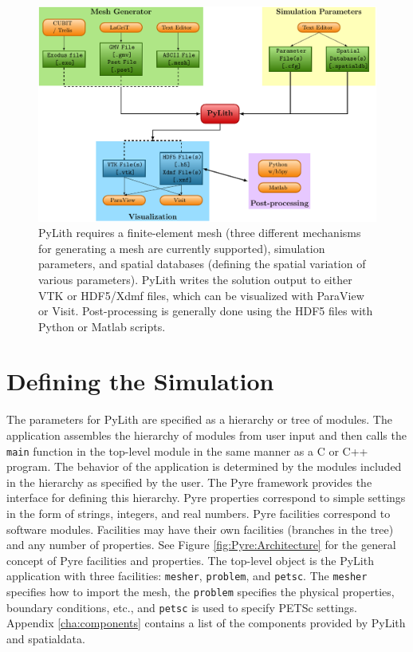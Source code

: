 \noindent \begin{center}
\begin{figure}[H]
\noindent \begin{centering}
\includegraphics[width=5in]{runpylith/figs/runpylith} 
\par\end{centering}

\caption{PyLith requires a finite-element mesh (three different mechanisms
for generating a mesh are currently supported), simulation parameters,
and spatial databases (defining the spatial variation of various parameters).
PyLith writes the solution output to either VTK or HDF5/Xdmf files,
which can be visualized with ParaView or Visit. Post-processing is
generally done using the HDF5 files with Python or Matlab scripts.}


\label{fig:pylith:workflow} 
\end{figure}

\par\end{center}


\section{Defining the Simulation}

The parameters for PyLith are specified as a hierarchy or tree of
modules. The application assembles the hierarchy of modules from user
input and then calls the \texttt{main} function in the top-level module
in the same manner as a C or C++ program. The behavior of the application
is determined by the modules included in the hierarchy as specified
by the user. The Pyre framework provides the interface for defining
this hierarchy. Pyre properties correspond to simple settings in the
form of strings, integers, and real numbers. Pyre facilities correspond
to software modules. Facilities may have their own facilities (branches
in the tree) and any number of properties. See Figure \ref{fig:Pyre:Architecture}
for the general concept of Pyre facilities and properties. The top-level
object is the PyLith application with three facilities: \texttt{mesher},
\texttt{problem}, and \texttt{petsc}. The \texttt{mesher} specifies
how to import the mesh, the \texttt{problem} specifies the physical
properties, boundary conditions, etc., and \texttt{petsc} is used
to specify PETSc settings. Appendix \ref{cha:components} contains
a list of the components provided by PyLith and spatialdata.


